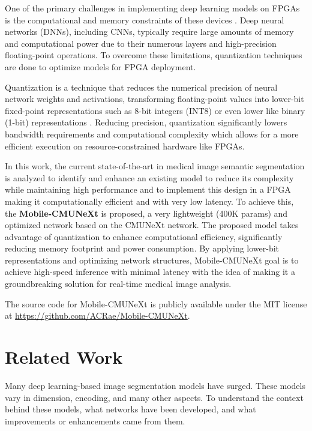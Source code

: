 \documentclass[lettersize,journal]{IEEEtran}
\begin{document}
One of the primary challenges in implementing deep learning models on FPGAs is the computational and memory constraints of these devices \cite{sharma2016high}. Deep neural networks (DNNs), including CNNs, typically require large amounts of memory and computational power due to their numerous layers and high-precision floating-point operations. To overcome these limitations, quantization techniques are done to optimize models for FPGA deployment.

Quantization is a technique that reduces the numerical precision of neural network weights and activations, transforming floating-point values into lower-bit fixed-point representations such as 8-bit integers (INT8) or even lower like binary (1-bit) representations \cite{nagel2021white}. Reducing precision, quantization significantly lowers bandwidth requirements and computational complexity which allows for a more efficient execution on resource-constrained hardware like FPGAs.

In this work, the current state-of-the-art in medical image semantic segmentation is analyzed to identify and enhance an existing model to reduce its complexity while maintaining high performance and to implement this design in a FPGA making it computationally efficient and with very low latency. To achieve this, the \textbf{Mobile-CMUNeXt} is proposed, a very lightweight (400K params) and optimized network based on the CMUNeXt \cite{tang2024cmunext} network. The proposed model takes advantage of quantization to enhance computational efficiency, significantly reducing memory footprint and power consumption. By applying lower-bit representations and optimizing network structures, Mobile-CMUNeXt goal is to achieve high-speed inference with minimal latency with the idea of making it a groundbreaking solution for real-time medical image analysis.

The source code for Mobile-CMUNeXt is publicly available under the MIT license at \url{https://github.com/ACRae/Mobile-CMUNeXt}.

\section{Related Work}
Many deep learning-based image segmentation models have surged. These models vary in dimension, encoding, and many other aspects. %
To understand the context behind these models, what networks have been developed, and what improvements or enhancements came from them.  
\end{document}
